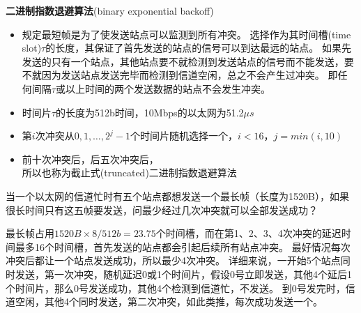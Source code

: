 \myhline
\textbf{二进制指数退避算法}(binary exponential backoff)
\begin{itemize}
	\item 规定最短帧是为了使发送站点可以监测到所有冲突。
	选择作为其时间槽(time slot)$\tau$的长度，其保证了首先发送的站点的信号可以到达最远的站点。
	如果先发送的只有一个站点，其他站点要不就检测到发送站点的信号而不能发送，要不就因为发送站点发送完毕而检测到信道空闲，总之不会产生过冲突。
	即任何间隔$\tau$或以上时间的两个发送数据的站点不会发生冲突。
	\item 时间片$\tau$的长度为512b时间，10Mbps的以太网为51.2$\mu s$
	\item 第$i$次冲突从$0,1,\ldots,2^j-1$个时间片随机选择一个，$i<16$，$j = min(i,10)$
	\item 前十次冲突后，后五次冲突后，\\
	所以也称为截止式(truncated)二进制指数退避算法
\end{itemize}

\begin{example}
	当一个以太网的信道忙时有五个站点都想发送一个最长帧（长度为1520B），如果很长时间只有这五帧要发送，问最少经过几次冲突就可以全部发送成功？
\end{example}
\begin{analysis}
	最长帧占用$1520B\times 8/512b=23.75$个时间槽，而在第1、2、3、4次冲突的延迟时间最多16个时间槽，首先发送的站点都会引起后续所有站点冲突。
	最好情况每次冲突后都让一个站点发送成功，所以最少4次冲突。
	详细来说，一开始5个站点同时发送，第一次冲突，随机延迟0或1个时间片，假设0号立即发送，其他4个延后1个时间片，那么0号发送成功，其他4个检测到信道忙，不发送。
	到0号发完时，信道空闲，其他4个同时发送，第二次冲突，如此类推，每次成功发送一个。
\end{analysis}

